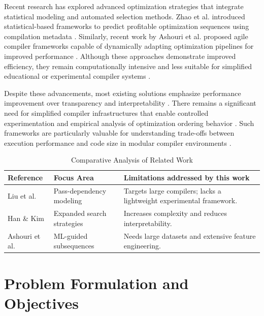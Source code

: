 \documentclass[conference]{IEEEtran}
\begin{document}
Recent research has explored advanced optimization strategies that integrate statistical modeling and automated selection methods. Zhao et al. introduced statistical-based frameworks to predict profitable optimization sequences using compilation metadata \cite{ref7}. Similarly, recent work by Ashouri et al. proposed agile compiler frameworks capable of dynamically adapting optimization pipelines for improved performance \cite{ref27}. Although these approaches demonstrate improved efficiency, they remain computationally intensive and less suitable for simplified educational or experimental compiler systems \cite{ref27}.

Despite these advancements, most existing solutions emphasize performance improvement over transparency and interpretability \cite{ref2}. There remains a significant need for simplified compiler infrastructures that enable controlled experimentation and empirical analysis of optimization ordering behavior \cite{ref1}. Such frameworks are particularly valuable for understanding trade-offs between execution performance and code size in modular compiler environments \cite{ref19}.

\begin{table}[htbp]
\caption{Comparative Analysis of Related Work}
\label{tab:lit_review}
\centering
\renewcommand{\arraystretch}{1.3}
\begin{tabularx}{\columnwidth}{@{}p{} p{} X@{}}
\toprule
\textbf{Reference} & \textbf{Focus Area} & \textbf{Limitations addressed by this work} \\
\midrule
Liu et al. \cite{ref1} & Pass-dependency modeling & Targets large compilers; lacks a lightweight experimental framework. \\
\addlinespace
Han \& Kim \cite{ref2} & Expanded search strategies & Increases complexity and reduces interpretability. \\
\addlinespace
Ashouri et al. \cite{ref15} & ML-guided subsequences & Needs large datasets and extensive feature engineering. \\
\bottomrule
\end{tabularx}
\end{table}

\section{Problem Formulation and Objectives}
\end{document}
